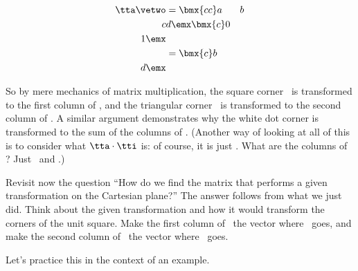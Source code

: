 \begin{align*}
\tta\vetwo &= \bmx{cc}a&b\\c&d\emx\bmx{c}0\\1\emx \\
					&= \bmx{c}b\\d\emx
\end{align*}

So by mere mechanics of matrix multiplication, the square corner \veone\ is transformed to the first column of \tta, and the triangular corner \vetwo\ is transformed to the second column of \tta. A similar argument demonstrates why the white dot corner is transformed to the sum of the columns of \tta. (Another way of looking at all of this is to consider what $\tta\cdot\tti$ is: of course, it is just \tta. What are the columns of \tti? Just \veone\ and \vetwo.)

Revisit now the question ``How do we find the matrix that performs a given transformation on the Cartesian plane?'' The answer follows from what we just did. Think about the given transformation and how it would transform the corners of the unit square. Make the first column of \tta\ the vector where \veone\ goes, and make the second column of \tta\ the vector where \vetwo\ goes.

Let's practice this in the context of an example.

\medskip

